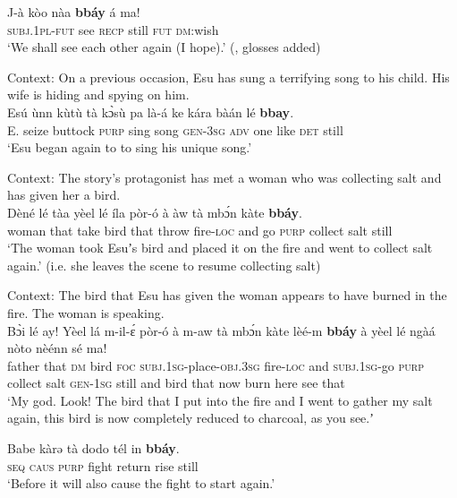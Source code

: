 \begin{exe}
	\ex\label{exAppendixKabaIterative1}
	\gll
	J-à kòo nàa \textbf{bbáy} á ma!\\
	\textsc{subj}.1\textsc{pl}-\textsc{fut} see \textsc{recp} still \textsc{fut} \textsc{dm}:wish\\
	\glt \lq We shall see each other again (I hope).\rq{ }(\cite[126]{MoserDingatoloum2007}, glosses added)

	\ex\label{exAppendixKabaIterative2}
	Context: On a previous occasion, Esu has sung a terrifying song to his child. His wife is hiding and spying on him.\\
	\exi{}\gll Esú ùnn kùtù tà kɔ̀sù pa là-á ke kára bàán lé \textbf{bbay}.\\
	E. seize buttock \textsc{purp} sing song \textsc{gen}-3\textsc{sg} \textsc{adv} one like \textsc{det} still\\
	\glt \lq Esu began again to to sing his unique song.' \parencite[450]{Moser2004}
	
	\ex\label{exAppendixKabaRestitutive1}
	Context: The story's protagonist has met a woman who was collecting salt and has given her a bird.\\
	\gll Dèné lé tàa yèel lé íla pòr-ó à àw tà mbɔ́n kàte \textbf{bbáy}.\\
	woman that take bird that throw fire-\textsc{loc} and go \textsc{purp} collect salt still\\
	\glt \lq The woman took Esuʼs bird and placed it on the fire and went to collect salt again.' (i.e. she leaves the scene to resume collecting salt) \parencite[436]{Moser2004}
	
	\ex\label{exAppendixKabaRestitutive2}
	Context: The bird that Esu has given the woman appears to have burned in the fire. The woman is speaking.\\
	\gll Bɔ̀i lé ay! Yèel lá m-il-ɛ́ pòr-ó à m-aw tà mbɔ́n kàte lèé-m \textbf{bbáy} à yèel lé ngàá nòto nèénn sé ma!\\
	father that \textsc{dm} bird \textsc{foc} \textsc{subj}.1\textsc{sg}-place-\textsc{obj}.3\textsc{sg} fire-\textsc{loc} and \textsc{subj}.1\textsc{sg}-go \textsc{purp} collect salt \textsc{gen}-1\textsc{sg} still and bird that now burn here see that\\
	\glt \lq My god. Look! The bird that I put into the fire and I went to gather my salt again, this bird is now completely reduced to charcoal, as you see.ʼ \parencite[437]{Moser2004}	
	
	\ex\label{exAppendixKabaRestitutive3}
	\gll Babe kàrə tà dodo tél in \textbf{bbáy}.\\
	\textsc{seq} \textsc{caus}	\textsc{purp} fight return rise still\\
	\glt \lq Before it will also cause the fight to start again.' \parencite[425]{Moser2004}	
\end{exe}

